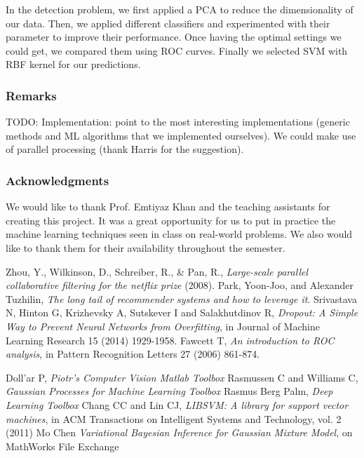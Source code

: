 \documentclass[10pt,a4paper]{article}
\begin{document}
  In the detection problem, we first applied a PCA to reduce the dimensionality of our data. Then, we applied different classifiers and experimented with their parameter to improve their performance. Once having the optimal settings we could get, we compared them using ROC curves. Finally we selected SVM with RBF kernel for our predictions.

    \subsubsection*{Remarks}
    TODO: Implementation: point to the most interesting implementations (generic methods and ML algorithms that we implemented ourselves). We could make use of parallel processing (thank Harris for the suggestion).

    \subsubsection*{Acknowledgments}
    We would like to thank Prof. Emtiyaz Khan and the teaching assistants for creating this project. It was a great opportunity for us to put in practice the machine learning techniques seen in class on real-world problems. We also would like to thank them for their availability throughout the semester.\\

    \begin{thebibliography}{99}

       Zhou, Y., Wilkinson, D., Schreiber, R., \& Pan, R., \textit{Large-scale parallel collaborative filtering for the netflix prize} (2008).
       Park, Yoon-Joo, and Alexander Tuzhilin, \textit{The long tail of recommender systems and how to leverage it}.
       Srivastava N, Hinton G, Krizhevsky A, Sutskever I and Salakhutdinov R, \textit{Dropout: A Simple Way to Prevent Neural Networks from Overfitting}, in Journal of Machine Learning Research 15 (2014) 1929-1958.
       Fawcett T, \textit{An introduction to ROC analysis}, in Pattern Recognition Letters 27 (2006) 861-874.

       Doll'ar P, \textit{Piotr's Computer Vision Matlab Toolbox}
       Rasmussen C and Williams C, \textit{Gaussian Processes for Machine Learning Toolbox}
       Rasmus Berg Palm, \textit{Deep Learning Toolbox}
       Chang CC and Lin CJ, \textit{LIBSVM: A library for support vector machines}, in ACM Transactions on Intelligent Systems and Technology, vol. 2 (2011)
       Mo Chen \textit{Variational Bayesian Inference for Gaussian Mixture Model}, on MathWorks File Exchange

    \end{thebibliography}
\end{document}
